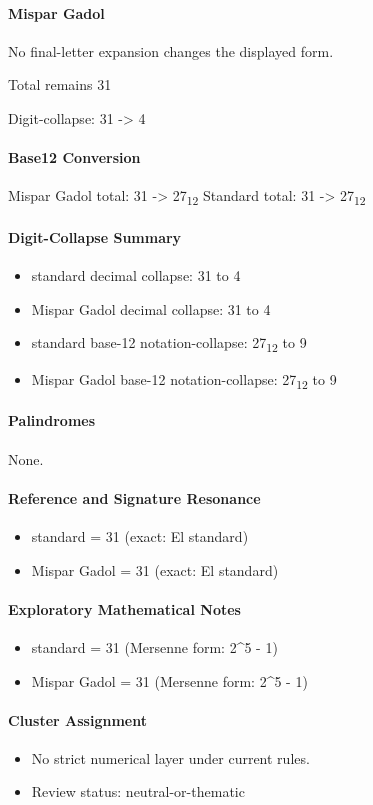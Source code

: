 \paragraph{Mispar Gadol}
No final-letter expansion changes the displayed form.

Total remains 31

Digit-collapse: 31 -> 4
\paragraph{Base12 Conversion}
Mispar Gadol total: 31 -> 27\textsubscript{12}
Standard total: 31 -> 27\textsubscript{12}
\paragraph{Digit-Collapse Summary}
\begin{itemize}
\item standard decimal collapse: 31 to 4
\item Mispar Gadol decimal collapse: 31 to 4
\item standard base-12 notation-collapse: 27\textsubscript{12} to 9
\item Mispar Gadol base-12 notation-collapse: 27\textsubscript{12} to 9
\end{itemize}
\paragraph{Palindromes}
None.
\paragraph{Reference and Signature Resonance}
\begin{itemize}
\item standard = 31 (exact: El standard)
\item Mispar Gadol = 31 (exact: El standard)
\end{itemize}
\paragraph{Exploratory Mathematical Notes}
\begin{itemize}
\item standard = 31 (Mersenne form: 2\textasciicircum{}5 - 1)
\item Mispar Gadol = 31 (Mersenne form: 2\textasciicircum{}5 - 1)
\end{itemize}
\paragraph{Cluster Assignment}
\begin{itemize}
\item No strict numerical layer under current rules.
\item Review status: neutral-or-thematic
\end{itemize}
